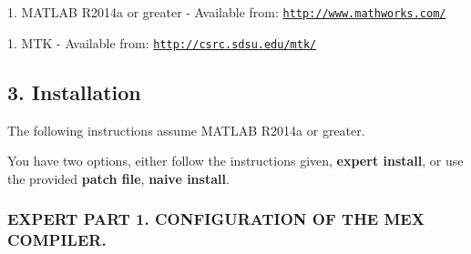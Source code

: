 \begin{DoxyPre}\end{DoxyPre}



\begin{DoxyPre}1. MATLAB R2014a or greater - Available from: \href{http://www.mathworks.com/}{\tt http://www.mathworks.com/}\end{DoxyPre}



\begin{DoxyPre}1. MTK - Available from: \href{http://csrc.sdsu.edu/mtk/}{\tt http://csrc.sdsu.edu/mtk/}


\end{DoxyPre}



\begin{DoxyPre}\subsection*{3. Installation}\end{DoxyPre}



\begin{DoxyPre}\end{DoxyPre}



\begin{DoxyPre}The following instructions assume MATLAB R2014a or greater.\end{DoxyPre}



\begin{DoxyPre}You have two options, either follow the instructions given, {\bfseries expert install},
or use the provided {\bfseries patch file}, {\bfseries naive install}.\end{DoxyPre}



\begin{DoxyPre}\subsubsection*{EXPERT PART 1. CONFIGURATION OF THE MEX COMPILER.}\end{DoxyPre}



\begin{DoxyPre}\end{DoxyPre}



